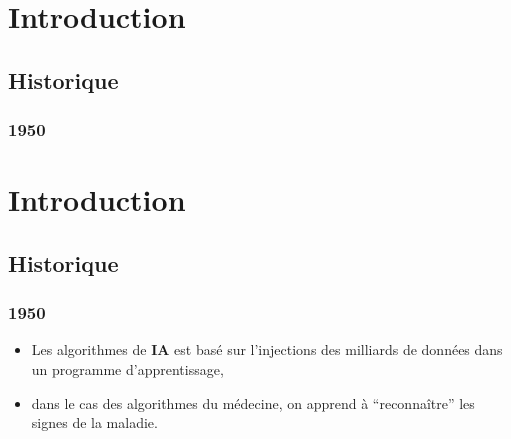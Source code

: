 \pagestyle{monstyle}\setcounter{page}{1}
\chapter{Introduction}
\vspace{2cm}
\section{Historique}
\vspace{-1cm}
\subsection{1950}
\vspace{-1cm}
\chapter{Introduction}

\section{Historique}

\subsection{1950}


\begin{itemize}
\item
Les algorithmes de \textbf{IA} est basé sur  l'injections des milliards de données
dans un programme d'apprentissage,
\item
dans le cas des algorithmes du médecine, on apprend à ``reconnaître'' les signes
de la maladie.
\end{itemize}
